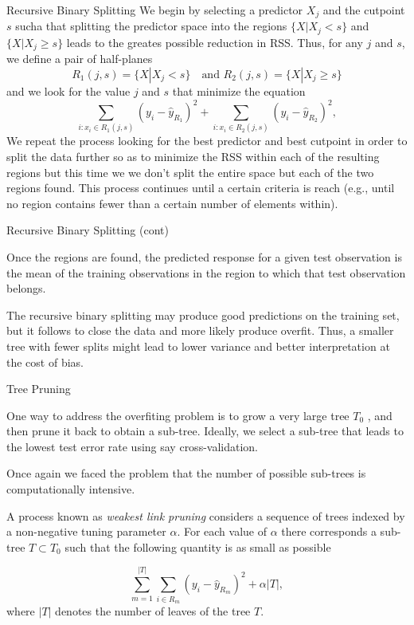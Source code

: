 \documentclass{beamer}
\begin{document}
\begin{frame}{Recursive Binary Splitting}
	We begin by selecting a predictor $X_j$ and the cutpoint $s$ sucha that splitting the predictor space into the regions $\{ X| X_j <s \}$ and $\{ X | X_j \ge s\}$ leads to the greates possible reduction in RSS. Thus, for any $j$ and $s$, we define a pair of half-planes
	\begin{equation}
		R_1(j,s)= \{ X | X_j <s\} \quad \textrm{and } R_2(j,s)= \{X| X_j\ge s\}
		\label{eq:rbs1}
	\end{equation}
and we look for the value $j$ and $s$ that minimize the equation
\begin{equation}
	\sum_{i: x_i \in R_1(j,s)} (y_i - \hat{y}_{R_1})^2 + 	\sum_{i: x_i \in R_2(j,s)} (y_i - \hat{y}_{R_2})^2 ,
	\label{eq:rbs2}
\end{equation}
We repeat the process looking for the best predictor and best cutpoint in order to split the data further so as to minimize the RSS within each of the resulting regions but this time we we don't split the entire space but each of the two regions found. This process continues until a certain criteria is reach (e.g., until no region contains fewer than a certain number of elements within). 


\end{frame}

\begin{frame}{Recursive Binary Splitting (cont)}

Once the regions are found, the predicted response for a given test observation is the mean of the training observations in the region to which that test observation belongs.

The recursive binary splitting may produce good predictions on the training set, but it follows to close the data and more likely produce overfit. Thus, a smaller tree with fewer splits might lead to lower variance and better interpretation at the cost of bias.
\end{frame}

\begin{frame}{Tree Pruning}
	
	
	One way to address the overfiting problem is to grow a very large tree $T_0$ , and then prune it back to obtain a sub-tree. Ideally, we select a sub-tree that leads to the lowest test error rate using say cross-validation. 
	
	Once again we faced the  problem that the number of possible sub-trees is computationally intensive.
	
	A process known as {\it weakest link pruning} considers a sequence of trees indexed by a non-negative tuning parameter $\alpha$. For each value of $\alpha$ there corresponds a sub-tree $T \subset T_0$ such that the following quantity is as small as possible
	
	\begin{equation}
		\sum_{m=1}^{|T|} \sum_{i\in R_m} (y_i -\hat{y}_{R_m})^2 + \alpha |T|,
	\end{equation}
	 where $|T|$ denotes the number of leaves of the tree $T$.
\end{frame}
\end{document}
